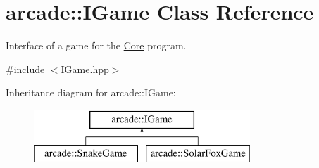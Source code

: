 \hypertarget{classarcade_1_1_i_game}{}\section{arcade\+:\+:I\+Game Class Reference}
\label{classarcade_1_1_i_game}


Interface of a game for the \hyperlink{classarcade_1_1_core}{Core} program.  




{\ttfamily \#include $<$I\+Game.\+hpp$>$}

Inheritance diagram for arcade\+:\+:I\+Game\+:\begin{figure}[H]
\begin{center}
\leavevmode
\includegraphics[height=2.000000cm]{classarcade_1_1_i_game}
\end{center}
\end{figure}
